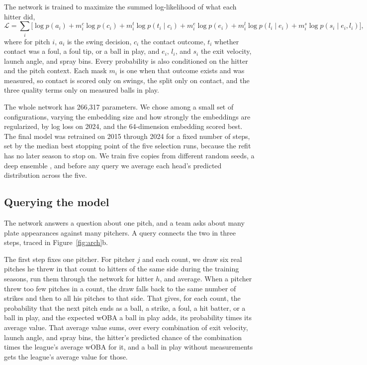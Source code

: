 \documentclass[11pt,letterpaper]{article}
\begin{document}
The network is trained to maximize the summed log-likelihood of what each hitter did,
\begin{equation}
\mathcal{L} = \sum_{i} \Big[ \log p(a_i) + m^{c}_i \log p(c_i) + m^{t}_i \log p(t_i \mid c_i) + m^{e}_i \log p(e_i) + m^{l}_i \log p(l_i \mid e_i) + m^{s}_i \log p(s_i \mid e_i, l_i) \Big],
\label{eq:loss}
\end{equation}
where for pitch $i$, $a_i$ is the swing decision, $c_i$ the contact outcome, $t_i$ whether contact was a foul, a foul tip, or a ball in play, and $e_i$, $l_i$, and $s_i$ the exit velocity, launch angle, and spray bins. Every probability is also conditioned on the hitter and the pitch context. Each mask $m_i$ is one when that outcome exists and was measured, so contact is scored only on swings, the split only on contact, and the three quality terms only on measured balls in play.

The whole network has 266,317 parameters. We chose among a small set of configurations, varying the embedding size and how strongly the embeddings are regularized, by log loss on 2024, and the 64-dimension embedding scored best. The final model was retrained on 2015 through 2024 for a fixed number of steps, set by the median best stopping point of the five selection runs, because the refit has no later season to stop on. We train five copies from different random seeds, a deep ensemble \citep{lakshminarayanan2017}, and before any query we average each head's predicted distribution across the five.

\subsection{Querying the model}
\label{sec:query}

The network answers a question about one pitch, and a team asks about many plate appearances against many pitchers. A query connects the two in three steps, traced in Figure~\ref{fig:arch}b.

The first step fixes one pitcher. For pitcher $j$ and each count, we draw six real pitches he threw in that count to hitters of the same side during the training seasons, run them through the network for hitter $h$, and average. When a pitcher threw too few pitches in a count, the draw falls back to the same number of strikes and then to all his pitches to that side. That gives, for each count, the probability that the next pitch ends as a ball, a strike, a foul, a hit batter, or a ball in play, and the expected wOBA a ball in play adds, its probability times its average value. That average value sums, over every combination of exit velocity, launch angle, and spray bins, the hitter's predicted chance of the combination times the league's average wOBA for it, and a ball in play without measurements gets the league's average value for those.
\end{document}
